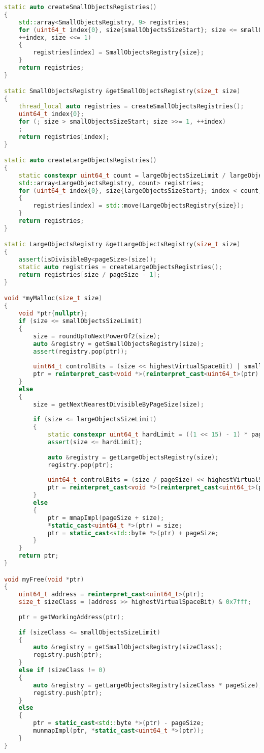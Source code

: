 \begin{lstlisting}[language=c++,caption={Код аллокатора}]
static auto createSmallObjectsRegistries()
{
	std::array<SmallObjectsRegistry, 9> registries;
	for (uint64_t index{0}, size{smallObjectsSizeStart}; size <= smallObjectsSizeLimit;
	++index, size <<= 1)
	{
		registries[index] = SmallObjectsRegistry{size};
	}
	return registries;
}

static SmallObjectsRegistry &getSmallObjectsRegistry(size_t size)
{
	thread_local auto registries = createSmallObjectsRegistries();
	uint64_t index{0};
	for (; size > smallObjectsSizeStart; size >>= 1, ++index)
	;
	return registries[index];
}

static auto createLargeObjectsRegistries()
{
	static constexpr uint64_t count = largeObjectsSizeLimit / largeObjectsSizeStart;
	std::array<LargeObjectsRegistry, count> registries;
	for (uint64_t index{0}, size{largeObjectsSizeStart}; index < count; ++index, size += pageSize)
	{
		registries[index] = std::move(LargeObjectsRegistry{size});
	}
	return registries;
}

static LargeObjectsRegistry &getLargeObjectsRegistry(size_t size)
{
	assert(isDivisibleBy<pageSize>(size));
	static auto registries = createLargeObjectsRegistries();
	return registries[size / pageSize - 1];
}

void *myMalloc(size_t size)
{
	void *ptr{nullptr};
	if (size <= smallObjectsSizeLimit)
	{
		size = roundUpToNextPowerOf2(size);
		auto &registry = getSmallObjectsRegistry(size);
		assert(registry.pop(ptr));
		
		uint64_t controlBits = (size << highestVirtualSpaceBit) | smallObjectMask;
		ptr = reinterpret_cast<void *>(reinterpret_cast<uint64_t>(ptr) | controlBits);
	}
	else
	{
		size = getNextNearestDivisibleByPageSize(size);
		
		if (size <= largeObjectsSizeLimit)
		{
			static constexpr uint64_t hardLimit = ((1 << 15) - 1) * pageSize;
			assert(size <= hardLimit);
			
			auto &registry = getLargeObjectsRegistry(size);
			registry.pop(ptr);
			
			uint64_t controlBits = (size / pageSize) << highestVirtualSpaceBit;
			ptr = reinterpret_cast<void *>(reinterpret_cast<uint64_t>(ptr) | controlBits);
		}
		else
		{
			ptr = mmapImpl(pageSize + size);
			*static_cast<uint64_t *>(ptr) = size;
			ptr = static_cast<std::byte *>(ptr) + pageSize;
		}
	}
	return ptr;
}

void myFree(void *ptr)
{
	uint64_t address = reinterpret_cast<uint64_t>(ptr);
	size_t sizeClass = (address >> highestVirtualSpaceBit) & 0x7fff;
	
	ptr = getWorkingAddress(ptr);
	
	if (sizeClass <= smallObjectsSizeLimit)
	{
		auto &registry = getSmallObjectsRegistry(sizeClass);
		registry.push(ptr);
	}
	else if (sizeClass != 0)
	{
		auto &registry = getLargeObjectsRegistry(sizeClass * pageSize);
		registry.push(ptr);
	}
	else
	{
		ptr = static_cast<std::byte *>(ptr) - pageSize;
		munmapImpl(ptr, *static_cast<uint64_t *>(ptr));
	}
}
\end{lstlisting}